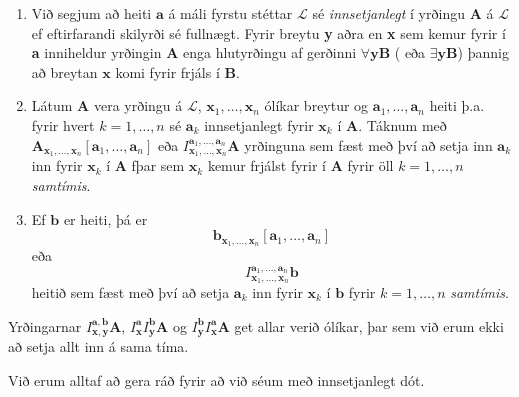 \documentclass[12pt]{article}
\begin{document}
\begin{skgr}
  \begin{enumerate}[(1)]
  \item Við segjum að heiti $\mathbf{a}$ á máli fyrstu stéttar
    $\mathcal{L}$ sé \emph{innsetjanlegt} í yrðingu \textbf{A} á
    $\mathcal{L}$ ef eftirfarandi skilyrði sé fullnægt. Fyrir breytu
    \textbf{y} aðra en \textbf{x} sem kemur fyrir í \textbf{a}
    inniheldur yrðingin \textbf{A} enga hlutyrðingu af gerðinni
    $\forall \mathbf{y} \mathbf{B}$ ( eða $\exists \mathbf{y}
    \mathbf{B}$) þannig að breytan $\mathbf{x}$ komi fyrir frjáls í
      $\mathbf{B}$.
    \item Látum \textbf{A} vera yrðingu á $\mathcal{L}$,
      $\mathbf{x}_1, \dotsc, \mathbf{x}_n$ ólíkar breytur og
      $\mathbf{a}_1, \dotsc, \mathbf{a}_n$ heiti þ.a. fyrir
      hvert $k = 1, \dotsc, n$ sé $\mathbf{a}_k$ innsetjanlegt
      fyrir $\mathbf{x}_k$ í $\mathbf{A}$.
      Táknum með $\mathbf{A}_{\mathbf{x}_1, \dotsc, \mathbf{x}_n}[\mathbf{a}_1, \dotsc, \mathbf{a}_n]$
      eða $I^{\mathbf{a}_1, \dotsc, \mathbf{a}_n}_{\mathbf{x}_1, \dotsc, \mathbf{x}_n} \mathbf{A}$
      yrðinguna sem fæst með því að setja inn $\mathbf{a}_k$ inn fyrir $\mathbf{x}_k$ í
      $\mathbf{A}$ fþar sem $\mathbf{x}_k$ kemur frjálst fyrir í $\mathbf{A}$ fyrir
      öll $k = 1, \dotsc, n$ \emph{samtímis}.

    \item Ef $\mathbf{b}$ er heiti, þá er
      \[ \mathbf{b}_{\mathbf{x}_1, \dotsc, \mathbf{x}_n} [ \mathbf{a}_1, \dotsc, \mathbf{a}_n] \]
      eða
      \[I^{\mathbf{a}_1, \dotsc, \mathbf{a}_n}_{\mathbf{x}_1, \dotsc, \mathbf{x}_n} \mathbf{b}\]
      heitið sem fæst með því að setja $\mathbf{a}_k$ inn fyrir $\mathbf{x}_k$ í $\mathbf{b}$
      fyrir $k= 1, \dotsc, n$ \emph{samtímis}.
    \end{enumerate}
\end{skgr}

\begin{ath}
  Yrðingarnar $I^{\mathbf{a}, \mathbf{b}}_{\mathbf{x}, \mathbf{y}} \mathbf{A}$,
  $I^{\mathbf{a}}_{\mathbf{x}} I^{\mathbf{b}}_{\mathbf{y}} \mathbf{A}$ og
  $I^{\mathbf{b}}_{\mathbf{y}} I^{\mathbf{a}}_{\mathbf{x}} \mathbf{A}$
  get allar verið ólíkar, þar sem við erum ekki að setja allt inn á sama tíma.
\end{ath}

Við erum alltaf að gera ráð fyrir að við séum með innsetjanlegt dót.
\end{document}

